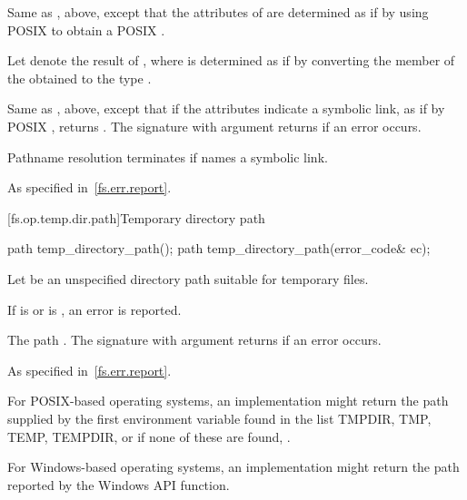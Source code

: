 \begin{itemdescr}
\pnum
\effects
Same as , above,
  except that the attributes
    of  are determined as if by using POSIX 
    to obtain a POSIX .

\pnum
Let  denote the result of ,
where  is determined as if by converting the  member
of the obtained  to the type .

\pnum
\returns
Same as , above, except
      that if the attributes indicate a symbolic link, as if by POSIX ,
      returns .
      The signature with argument  returns
       if an error occurs.

\pnum
\remarks
Pathname resolution terminates if  names a symbolic link.

\pnum
\throws
As specified in~\ref{fs.err.report}.
\end{itemdescr}


[fs.op.temp.dir.path]{Temporary directory path}

%
\begin{itemdecl}
path temp_directory_path();
path temp_directory_path(error_code& ec);
\end{itemdecl}

\begin{itemdescr}
\pnum
Let  be an unspecified directory path suitable for temporary files.

\pnum
\effects
If  is  or  is
  , an error is reported.

\pnum
\returns
The path .
  The signature with argument  returns  if an
  error occurs.

\pnum
\throws
As specified in~\ref{fs.err.report}.

\pnum
\begin{example}
For POSIX-based operating systems, an implementation might
  return the path
  supplied by the first environment variable found in the list TMPDIR, TMP, TEMP, TEMPDIR,
  or if none of these are found, .

For Windows-based operating systems, an implementation might return the path
  reported by the Windows  API function.
\end{example}
\end{itemdescr}

